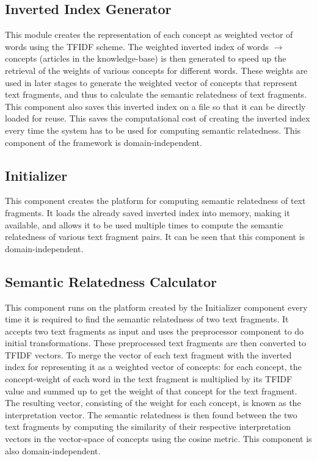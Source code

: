 \documentclass[conference]{IEEEtran}
\begin{document}
\subsection{Inverted Index Generator}

This module creates the representation of each concept as weighted vector of words using the TFIDF scheme. The weighted inverted index of words $\rightarrow$ concepts (articles in the knowledge-base) is then generated to speed up the retrieval of the weights of various concepts for different words. These weights are used in later stages to generate the weighted vector of concepts that represent text fragments, and thus to calculate the semantic relatedness of text fragments. This component also saves this inverted index on a file so that it can be directly loaded for reuse. This saves the computational cost of creating the inverted index every time the system has to be used for computing semantic relatedness. This component of the framework is domain-independent.

\subsection{Initializer}

This component creates the platform for computing semantic relatedness of text fragments. It loads the already saved inverted index into memory, making it available, and allows it to be used multiple times to compute the semantic relatedness of various text fragment pairs. It can be seen that this component is domain-independent.

\subsection{Semantic Relatedness Calculator}

This component runs on the platform created by the Initializer component every time it is required to find the semantic relatedness of two text fragments. It accepts two text fragments as input and uses the preprocessor component to do initial transformations. These preprocessed text fragments are then converted to TFIDF vectors. To merge the vector of each text fragment with the inverted index for representing it as a weighted vector of concepts: for each concept, the concept-weight of each word in the text fragment is multiplied by its TFIDF value and summed up to get the weight of that concept for the text fragment. The resulting vector, consisting of the weight for each concept, is known as the interpretation vector. The semantic relatedness is then found between the two text fragments by computing the similarity of their respective interpretation vectors in the vector-space of concepts using the cosine metric. This component is also domain-independent.
\end{document}
